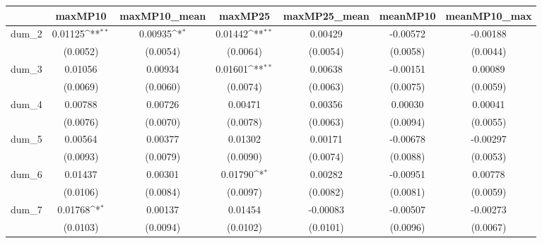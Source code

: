 {
\def\sym#1{\ifmmode^{#1}\else\(^{#1}\)\fi}
\begin{tabular}{l*{6}{c}}
\toprule
            &\multicolumn{1}{c}{maxMP10}&\multicolumn{1}{c}{maxMP10\_mean}&\multicolumn{1}{c}{maxMP25}&\multicolumn{1}{c}{maxMP25\_mean}&\multicolumn{1}{c}{meanMP10}&\multicolumn{1}{c}{meanMP10\_max}\\
\midrule
dum\_2       &     0.01125\sym{**} &     0.00935\sym{*}  &     0.01442\sym{**} &     0.00429         &    -0.00572         &    -0.00188         \\
            &    (0.0052)         &    (0.0054)         &    (0.0064)         &    (0.0054)         &    (0.0058)         &    (0.0044)         \\
dum\_3       &     0.01056         &     0.00934         &     0.01601\sym{**} &     0.00638         &    -0.00151         &     0.00089         \\
            &    (0.0069)         &    (0.0060)         &    (0.0074)         &    (0.0063)         &    (0.0075)         &    (0.0059)         \\
dum\_4       &     0.00788         &     0.00726         &     0.00471         &     0.00356         &     0.00030         &     0.00041         \\
            &    (0.0076)         &    (0.0070)         &    (0.0078)         &    (0.0063)         &    (0.0094)         &    (0.0055)         \\
dum\_5       &     0.00564         &     0.00377         &     0.01302         &     0.00171         &    -0.00678         &    -0.00297         \\
            &    (0.0093)         &    (0.0079)         &    (0.0090)         &    (0.0074)         &    (0.0088)         &    (0.0053)         \\
dum\_6       &     0.01437         &     0.00301         &     0.01790\sym{*}  &     0.00282         &    -0.00951         &     0.00778         \\
            &    (0.0106)         &    (0.0084)         &    (0.0097)         &    (0.0082)         &    (0.0081)         &    (0.0059)         \\
dum\_7       &     0.01768\sym{*}  &     0.00137         &     0.01454         &    -0.00083         &    -0.00507         &    -0.00273         \\
            &    (0.0103)         &    (0.0094)         &    (0.0102)         &    (0.0101)         &    (0.0096)         &    (0.0067)         \\

\end{tabular}}
